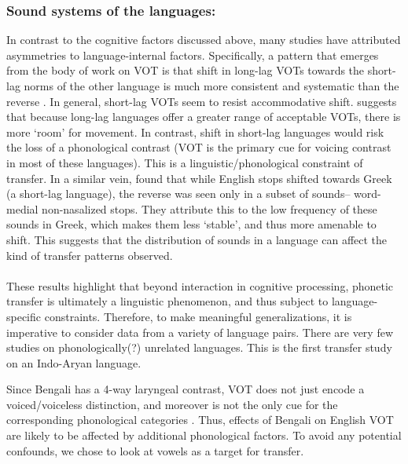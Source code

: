 \documentclass[11pt]{article}
\begin{document}
\subsubsection{Sound systems of the languages:} \label{sound systems} In contrast to the cognitive factors discussed above, many studies have attributed asymmetries to language-internal factors. Specifically, a pattern that emerges from the body of work on VOT is that shift in long-lag VOTs towards the short-lag norms of the other language is much more consistent and systematic than the reverse \cite{tobin2017phonetic, olson2016role,bullock2009trying,antoniou2011inter,chang2012rapid}. In general, short-lag VOTs seem to resist accommodative shift.  suggests that because long-lag languages offer a greater range of acceptable VOTs, there is more `room' for movement. In contrast, shift in short-lag languages would risk the loss of a phonological contrast (VOT is the primary cue for voicing contrast in most of these languages).  This is a linguistic/phonological constraint of transfer.
In a similar vein,  found that while English stops shifted towards Greek (a short-lag language), the reverse was seen only in a subset of sounds-- word-medial non-nasalized stops. They attribute this to the low frequency of these sounds in Greek, which makes them less `stable', and thus more amenable to shift. This suggests that the distribution of sounds in a language can affect the kind of transfer patterns observed.

\paragraph{}These results highlight that beyond interaction in cognitive processing, phonetic transfer is ultimately a linguistic phenomenon, and thus subject to language-specific constraints. Therefore, to make meaningful generalizations, it is imperative to consider data from a variety of language pairs. There are very few studies on phonologically(?) unrelated languages. This is the first transfer study on an Indo-Aryan language. 

Since Bengali has a 4-way laryngeal contrast, VOT does not just encode a voiced/voiceless distinction, and moreover is not the only cue for the corresponding phonological categories \cite{dmitrieva2020acoustic}. Thus, effects of Bengali on English VOT are likely to be affected by additional phonological factors. To avoid any potential confounds, we chose to look at vowels as a target for transfer. 
\end{document}
